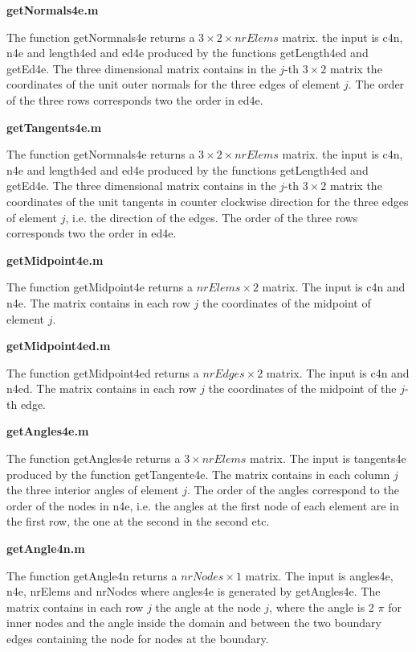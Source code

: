{\bf \large getNormals4e.m}\medskip

The function getNormnals4e returns a $3 \times 2 \times nrElems$ matrix. the input is 
c4n, n4e and length4ed and ed4e produced by the functions getLength4ed and getEd4e. The three dimensional
matrix contains in the $j$-th $3 \times 2$ matrix the coordinates of the unit outer normals for 
the three edges of element $j$. The order of the three rows corresponds two the order in ed4e.\medskip

{\bf \large getTangents4e.m}\medskip

The function getNormnals4e returns a $3 \times 2 \times nrElems$ matrix. the input is 
c4n, n4e and length4ed and ed4e produced by the functions getLength4ed and getEd4e. The 
three dimensional matrix contains in the $j$-th $3 \times 2$ matrix the coordinates of the unit tangents in 
counter clockwise direction for the three edges of element $j$, i.e. the direction of the edges. 
The order of the three rows corresponds two the order in ed4e.\medskip

{\bf \large getMidpoint4e.m}\medskip

The function getMidpoint4e returns a $nrElems \times 2$ matrix. The input is c4n and n4e. The matrix 
contains in each row $j$ the coordinates of the midpoint of element $j$.\medskip

{\bf \large getMidpoint4ed.m}\medskip

The function getMidpoint4ed returns a $nrEdges \times 2$ matrix. The input is c4n and n4ed. The matrix 
contains in each row $j$ the coordinates of the midpoint of the $j$-th edge.\medskip

{\bf \large getAngles4e.m}\medskip

The function getAngles4e returns a $3 \times nrElems$ matrix. The input is tangents4e produced by 
the function getTangente4e. The matrix contains in each column $j$ the three interior angles of element 
$j$. The order of the angles correspond to the order of the nodes in n4e, i.e. the angles at the first 
node of each element are in the first row, the one at the second in the second etc.\medskip

{\bf \large getAngle4n.m}\medskip

The function getAngle4n returns a $nrNodes \times 1$ matrix. The input is angles4e, n4e, nrElems and nrNodes 
where angles4e is generated by getAngles4e. The matrix contains in each row $j$ the angle at the node $j$, where 
the angle is 2 $\pi$ for inner nodes and the angle inside the domain and between the two boundary edges 
containing the node for nodes at the boundary.\medskip

